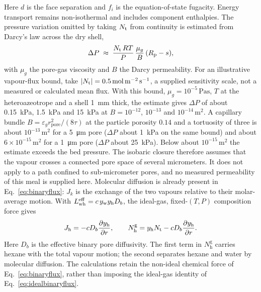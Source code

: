 Here $d$ is the face separation and $f_i$ is the equation-of-state fugacity.
Energy transport remains non-isothermal and includes component enthalpies.
The pressure variation omitted by
taking $N_{\mathrm{t}}$ from continuity is estimated from Darcy's law across the dry
shell,
\begin{equation}
\Delta P \;\approx\; \frac{N_{\mathrm{t}}\, R T}{P}\,\frac{\mu_{g}}{B}\,(R_{\mathrm{p}}-s),
\label{eq:darcy}
\end{equation}
with $\mu_{g}$ the pore-gas viscosity and $B$ the Darcy permeability.
For an illustrative vapour-flux bound, take
$|N_{\mathrm{t}}|=\SI{0.5}{\mole\per\square\metre\per\second}$, a supplied
sensitivity scale, not a measured or calculated mean flux. With this bound,
$\mu_{g}=10^{-5}\,\si{\pascal\second}$, $T$ at the heteroazeotrope and a
shell \SI{1}{\milli\metre} thick, the estimate gives $\Delta P$ of about
\SI{0.15}{\kilo\pascal}, \SI{1.5}{\kilo\pascal} and \SI{15}{\kilo\pascal}
at $B=10^{-12}$, $10^{-13}$ and $10^{-14}\,\si{\square\metre}$. A capillary
bundle $B=\varepsilon_{g} r_{\mathrm{pore}}^{2}/(8\tau)$ at the particle
porosity $0.14$ and a tortuosity of three is about
$10^{-13}\,\si{\square\metre}$ for a \SI{5}{\micro\metre} pore
($\Delta P$ about \SI{1}{\kilo\pascal} on the same bound) and about
$6\times 10^{-15}\,\si{\square\metre}$ for a \SI{1}{\micro\metre} pore
($\Delta P$ about \SI{25}{\kilo\pascal}). Below about
$10^{-15}\,\si{\square\metre}$ the estimate exceeds the bed pressure.
The isobaric closure therefore assumes that the vapour crosses a
connected pore space of several micrometers. It does not apply to a path
confined to sub-micrometer pores, and no measured permeability
of this meal is supplied here.
Molecular diffusion is already present in Eq.~\eqref{eq:binaryflux}:
$J_k$ is the exchange of the two vapours relative to their molar-average
motion. With $L_{\mathrm{wh}}^{\mathrm{eff}}=c\,y_{\mathrm{w}}y_{\mathrm{h}} D_b$, the ideal-gas, fixed-$(T,P)$ composition
force gives
\begin{equation}
J_{\mathrm h}=-cD_b\frac{\partial y_{\mathrm h}}{\partial r},
\qquad
N_{\mathrm h}^{\mathrm g}=y_{\mathrm h}N_{\mathrm{t}}
                         -cD_b\frac{\partial y_{\mathrm h}}{\partial r}.
\label{eq:idealbinaryflux}
\end{equation}
Here $D_b$ is the effective binary pore diffusivity. The first term in
$N_{\mathrm h}^{\mathrm g}$ carries hexane with the total vapour motion;
the second separates hexane and water by molecular diffusion. The
calculations retain the non-ideal chemical force of
Eq.~\eqref{eq:binaryflux}, rather than imposing the ideal-gas identity
of Eq.~\eqref{eq:idealbinaryflux}.
